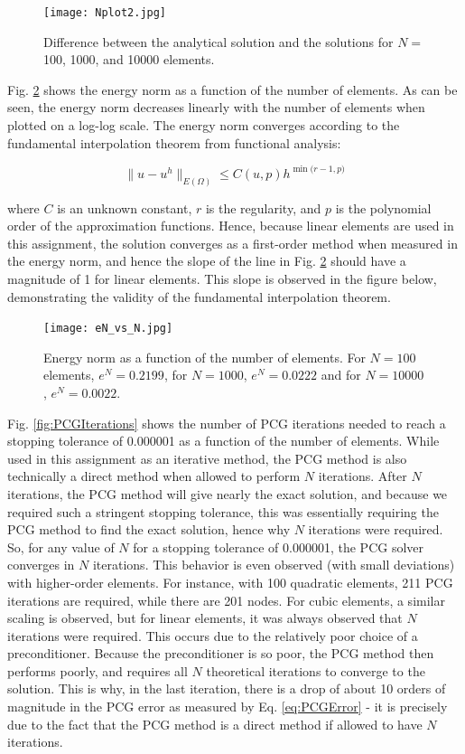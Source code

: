 \documentclass[10pt]{article}
\begin{document}
\begin{figure}[H]
  \centering
  \texttt{[image: Nplot2.jpg]} %
  \caption{Difference between the analytical solution and the solutions for \(N=\) 100, 1000, and 10000 elements.}
  \label{fig:NodalValues2}
\end{figure}

Fig. \ref{fig:eN_vs_N} shows the energy norm as a function of the number of elements. As can be seen, the energy norm decreases linearly with the number of elements when plotted on a log-log scale. The energy norm converges according to the fundamental interpolation theorem from functional analysis:

\begin{equation}
\label{eq:Theorem}
\|u-u^h\|_{E(\Omega)}\leq C(u, p)h^{\min{(r-1, p})}
\end{equation}

where \(C\) is an unknown constant, \(r\) is the regularity, and \(p\) is the polynomial order of the approximation functions. Hence, because linear elements are used in this assignment, the solution converges as a first-order method when measured in the energy norm, and hence the slope of the line in Fig. \ref{fig:eN_vs_N} should have a magnitude of 1 for linear elements. This slope is observed in the figure below, demonstrating the validity of the fundamental interpolation theorem.

\begin{figure}[H]
  \centering
  \texttt{[image: eN\_vs\_N.jpg]} %
  \caption{Energy norm as a function of the number of elements. For \(N=100\) elements, \(e^N=0.2199\), for \(N=1000\), \(e^N=0.0222\) and for \(N=10000\), \(e^N=0.0022\).}
  \label{fig:eN_vs_N}
\end{figure}

Fig. \ref{fig:PCGIterations} shows the number of PCG iterations needed to reach a stopping tolerance of 0.000001 as a function of the number of elements. While used in this assignment as an iterative method, the PCG method is also technically a direct method when allowed to perform \(N\) iterations. After \(N\) iterations, the PCG method will give nearly the exact solution, and because we required such a stringent stopping tolerance, this was essentially requiring the PCG method to find the exact solution, hence why \(N\) iterations were required. So, for any value of \(N\) for a stopping tolerance of 0.000001, the PCG solver converges in \(N\) iterations. This behavior is even observed (with small deviations) with higher-order elements. For instance, with 100 quadratic elements, 211 PCG iterations are required, while there are 201 nodes. For cubic elements, a similar scaling is observed, but for linear elements, it was always observed that \(N\) iterations were required. This occurs due to the relatively poor choice of a preconditioner. Because the preconditioner is so poor, the PCG method then performs poorly, and requires all \(N\) theoretical iterations to converge to the solution. This is why, in the last iteration, there is a drop of about 10 orders of magnitude in the PCG error as measured by Eq. \eqref{eq:PCGError} - it is precisely due to the fact that the PCG method is a direct method if allowed to have \(N\) iterations.
\end{document}
